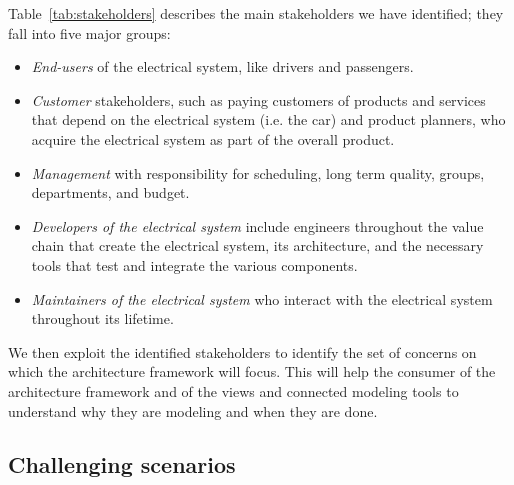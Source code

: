 Table~\ref{tab:stakeholders} describes the main stakeholders we have identified; they fall into five major groups: 

\begin{itemize}
\item \emph{End-users} of the electrical system, like drivers and passengers.
\item \emph{Customer} stakeholders, such as paying customers of products and services that depend on the electrical system (i.e. the car) and product planners, who acquire the electrical system as part of the overall product.
\item \emph{Management} with responsibility for scheduling, long term quality, groups, departments, and budget.
\item \emph{Developers of the electrical system}  include engineers throughout the value chain that create the electrical system, its architecture, and the necessary tools  that test and integrate the various components. 
\item \emph{Maintainers of the electrical system} who interact with the electrical system throughout its lifetime. 
\end{itemize}


We then exploit the identified stakeholders to identify the set of concerns on which the architecture framework will focus.
This will help the consumer of the architecture framework and of the views and connected modeling tools to understand why
they are modeling and when they are done. 

\subsection{Challenging scenarios}

